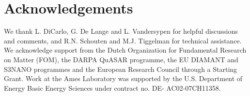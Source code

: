 \section{Acknowledgements}
We thank L. DiCarlo, G. De Lange and L. Vandersypen for helpful discussions and comments, and R.N. Schouten and M.J. Tiggelman for technical assistance. We acknowledge support from the Dutch Organization for Fundamental Research on Matter (FOM), the DARPA QuASAR programme, the EU DIAMANT and S3NANO programmes and the European Research Council through a Starting Grant. Work at the Ames Laboratory was supported by the U.S. Department of Energy Basic Energy Sciences under contract no. DE- AC02-07CH11358.




